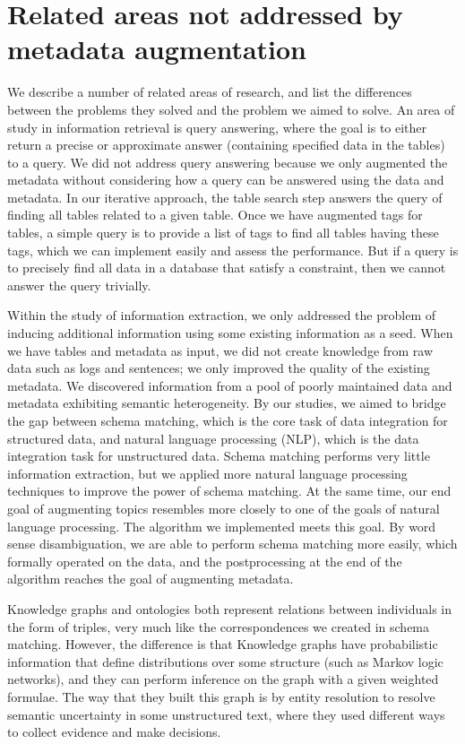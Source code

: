 \section{Related areas not addressed by metadata augmentation}
\label{sec:RelatedAreasNotAddressedByMetadataAugmentation}

We describe a number of related areas of research, and list the differences between the problems they solved and the problem we aimed to solve. An area of study in information retrieval is query answering, where the goal is to either return a precise or approximate answer (containing specified data in the tables) to a query. We did not address query answering because we only augmented the metadata without considering how a query can be answered using the data and metadata. In our iterative approach, the table search step answers the query of finding all tables related to a given table. Once we have augmented tags for tables, a simple query is to provide a list of tags to find all tables having these tags, which we can implement easily and assess the performance. But if a query is to precisely find all data in a database that satisfy a constraint, then we cannot answer the query trivially.

Within the study of information extraction, we only addressed the problem of inducing additional information using some existing information as a seed. When we have tables and metadata as input, we did not create knowledge from raw data such as logs and sentences; we only improved the quality of the existing metadata. We discovered information from a pool of poorly maintained data and metadata exhibiting semantic heterogeneity. By our studies, we aimed to bridge the gap between schema matching, which is the core task of data integration for structured data, and natural language processing (NLP), which is the data integration task for unstructured data. Schema matching performs very little information extraction, but we applied more natural language processing techniques to improve the power of schema matching. At the same time, our end goal of augmenting topics resembles more closely to one of the goals of natural language processing. The algorithm we implemented meets this goal. By word sense disambiguation, we are able to perform schema matching more easily, which formally operated on the data, and the postprocessing at the end of the algorithm reaches the goal of augmenting metadata.

Knowledge graphs and ontologies both represent relations between individuals in the form of triples, very much like the correspondences we created in schema matching. However, the difference is that Knowledge graphs have probabilistic information that define distributions over some structure (such as Markov logic networks), and they can perform inference on the graph with a given weighted formulae. The way that they built this graph is by entity resolution to resolve semantic uncertainty in some unstructured text, where they used different ways to collect evidence and make decisions.

